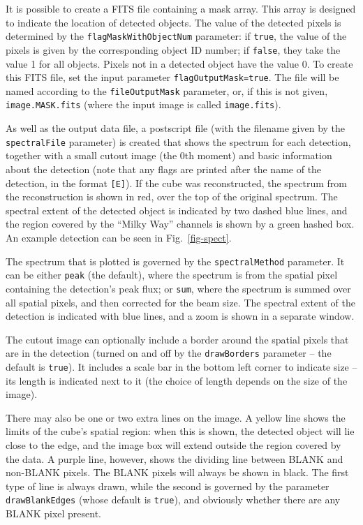\label{sec-maskOut}

It is possible to create a FITS file containing a mask array. This
array is designed to indicate the location of detected objects. The
value of the detected pixels is determined by the
\texttt{flagMaskWithObjectNum} parameter: if \texttt{true}, the value
of the pixels is given by the corresponding object ID number; if
\texttt{false}, they take the value 1 for all objects. Pixels not in a
detected object have the value 0. To create this FITS file, set the
input parameter \texttt{flagOutputMask=true}. The file will be named
according to the \texttt{fileOutputMask} parameter, or, if this is not
given, \texttt{image.MASK.fits} (where the input image is called
\texttt{image.fits}).


As well as the output data file, a postscript file (with the filename
given by the \texttt{spectralFile} parameter) is created that shows
the spectrum for each detection, together with a small cutout image
(the 0th moment) and basic information about the detection (note that
any flags are printed after the name of the detection, in the format
\texttt{[E]}). If the cube was reconstructed, the spectrum from the
reconstruction is shown in red, over the top of the original
spectrum. The spectral extent of the detected object is indicated by
two dashed blue lines, and the region covered by the ``Milky Way''
channels is shown by a green hashed box. An example detection can be
seen in Fig.~\ref{fig-spect}.

The spectrum that is plotted is governed by the
\texttt{spectralMethod} parameter. It can be either \texttt{peak} (the
default), where the spectrum is from the spatial pixel containing the
detection's peak flux; or \texttt{sum}, where the spectrum is summed
over all spatial pixels, and then corrected for the beam size.  The
spectral extent of the detection is indicated with blue lines, and a
zoom is shown in a separate window.

The cutout image can optionally include a border around the spatial
pixels that are in the detection (turned on and off by the
\texttt{drawBorders} parameter -- the default is \texttt{true}). It
includes a scale bar in the bottom left corner to indicate size -- its
length is indicated next to it (the choice of length depends on the
size of the image).

There may also be one or two extra lines on the image. A yellow line
shows the limits of the cube's spatial region: when this is shown, the
detected object will lie close to the edge, and the image box will
extend outside the region covered by the data. A purple line, however,
shows the dividing line between BLANK and non-BLANK pixels. The BLANK
pixels will always be shown in black. The first type of line is always
drawn, while the second is governed by the parameter
\texttt{drawBlankEdges} (whose default is \texttt{true}), and
obviously whether there are any BLANK pixel present.

